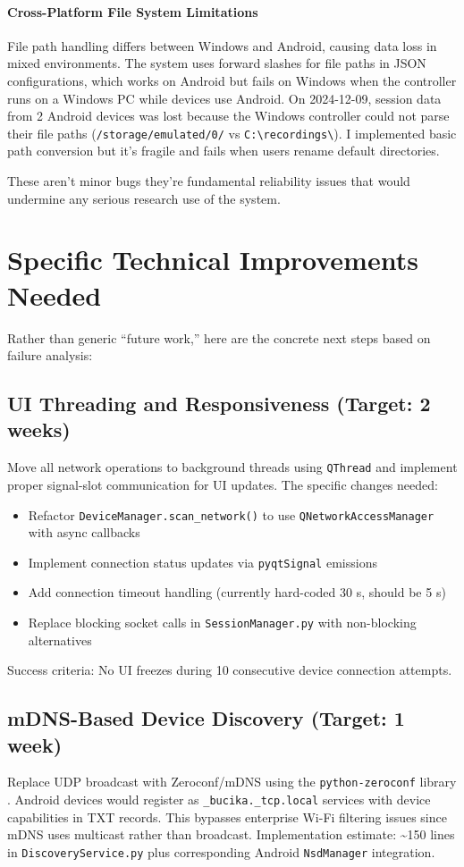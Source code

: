 \paragraph{\textbf{Cross-Platform File System Limitations}} File path handling differs between Windows and Android, causing data loss in mixed environments. The system uses forward slashes for file paths in JSON configurations, which works on Android but fails on Windows when the controller runs on a Windows PC while devices use Android. On 2024-12-09, session data from 2 Android devices was lost because the Windows controller could not parse their file paths (\verb|/storage/emulated/0/| vs \verb|C:\recordings\|). I implemented basic path conversion but it's fragile and fails when users rename default directories.

These aren't minor bugs \textemdash they're fundamental reliability issues that would undermine any serious research
use of the system.


\section{Specific Technical Improvements Needed}

Rather than generic ``future work,'' here are the concrete next steps based on failure analysis:

\subsection{UI Threading and Responsiveness (Target: 2 weeks)}
Move all network operations to background threads using \texttt{QThread} and implement proper signal-slot communication for UI updates. The specific changes needed:
\begin{itemize}
    \item Refactor \texttt{DeviceManager.scan\_network()} to use \texttt{QNetworkAccessManager} with async callbacks
    \item Implement connection status updates via \texttt{pyqtSignal} emissions
    \item Add connection timeout handling (currently hard-coded 30 s, should be 5 s)
    \item Replace blocking socket calls in \texttt{SessionManager.py} with non-blocking alternatives
\end{itemize}
Success criteria: No UI freezes during 10 consecutive device connection attempts.

\subsection{mDNS-Based Device Discovery (Target: 1 week)}
Replace UDP broadcast with Zeroconf/mDNS using the \texttt{python-zeroconf} library \cite{ref19}. Android devices would register as \texttt{\_bucika.\_tcp.local} services with device capabilities in TXT records. This bypasses enterprise Wi-Fi filtering issues since mDNS uses multicast rather than broadcast. Implementation estimate: \textasciitilde{}150 lines in \texttt{DiscoveryService.py} plus corresponding Android \texttt{NsdManager} integration.

